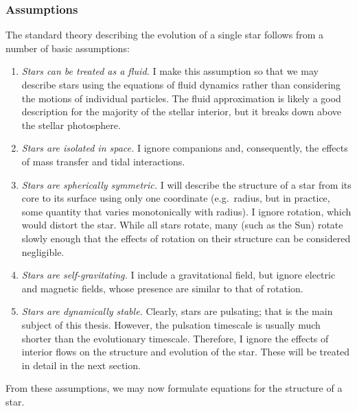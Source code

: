 \subsubsection*{Assumptions}
The standard theory describing the evolution of a single star follows from a number of basic assumptions:
\begin{enumerate}%
    \item \emph{Stars can be treated as a fluid.} 
    I make this assumption so that we may describe stars using the equations of fluid dynamics rather than considering the motions of individual particles. 
    The fluid approximation is likely a good description for the majority of the stellar interior, but it breaks down above the stellar photosphere. 
    \item \emph{Stars are isolated in space.} 
    I ignore companions and, consequently, the effects of mass transfer and tidal interactions. 
    \item \emph{Stars are spherically symmetric.} 
    I will describe the structure of a star from its core to its surface using only one coordinate (e.g.~radius, but in practice, some quantity that varies monotonically with radius). 
    I ignore rotation, which would distort the star. 
    While all stars rotate, many (such as the Sun) rotate slowly enough that the effects of rotation on their structure can be considered negligible. 
    \item \emph{Stars are self-gravitating.} 
    I include a gravitational field, but ignore electric and magnetic fields, whose presence are similar to that of rotation. 
    \item \emph{Stars are dynamically stable.} 
    Clearly, stars are pulsating; that is the main subject of this thesis. 
    However, the pulsation timescale is usually much shorter than the evolutionary timescale. 
    Therefore, I ignore the effects of interior flows on the structure and evolution of the star. 
    These will be treated in detail in the next section. 
\end{enumerate}
From these assumptions, we may now formulate equations for the structure of a star. 

